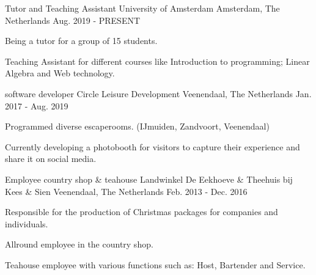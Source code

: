 


\begin{cventries}


\cventry
{Tutor and Teaching Assistant} %
{University of Amsterdam} %
{Amsterdam, The Netherlands} %
{Aug. 2019 - PRESENT} %
{ %
\begin{cvitems}
\item {Being a tutor for a group of 15 students.}
\item {Teaching Assistant for different courses like Introduction to programming; Linear Algebra and Web technology.}
\end{cvitems}
}

\cventry
{software developer} %
{Circle Leisure Development} %
{Veenendaal, The Netherlands} %
{Jan. 2017 - Aug. 2019} %
{ %
\begin{cvitems}
\item {Programmed diverse escaperooms. (IJmuiden, Zandvoort, Veenendaal)}
\item {Currently developing a photobooth for visitors to capture their experience and share it on social media.}
\end{cvitems}
}


\cventry
{Employee country shop \& teahouse} %
{Landwinkel De Eekhoeve \& Theehuis bij Kees \& Sien} %
{Veenendaal, The Netherlands} %
{Feb. 2013 - Dec. 2016} %
{ %
\begin{cvitems}
\item {Responsible for the production of Christmas packages for companies and individuals.}
\item {Allround employee in the country shop.}
\item {Teahouse employee with various functions such as: Host, Bartender and Service.}
\end{cvitems}
}


\end{cventries}